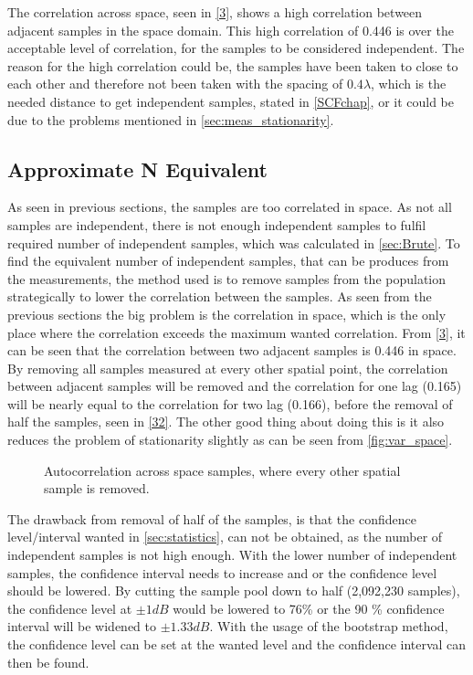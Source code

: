 The correlation across space, seen in \autoref{3}, shows a high correlation between adjacent samples in the space domain. This high correlation of 0.446 is over the acceptable level of correlation, for the samples to be considered independent. The reason for the high correlation could be, the samples have been taken to close to each other and therefore not been taken with the spacing of $0.4 \lambda$, which is the needed distance to get independent samples, stated in \autoref{SCFchap}, or it could be due to the problems mentioned in \autoref{sec:meas_stationarity}.


\subsection{Approximate N Equivalent}


As seen in previous sections, the samples are too correlated in space. As not all samples are independent, there is not enough independent samples to fulfil required number of independent samples, which was calculated in \autoref{sec:Brute}. To find the equivalent number of independent samples, that can be produces from the measurements, the method used is to remove samples from the population strategically to lower the correlation between the samples. As seen from the previous sections the big problem is the correlation in space, which is the only place where the correlation exceeds the maximum wanted correlation. From \autoref{3}, it can be seen that the correlation between two adjacent samples is 0.446 in space. By removing all samples measured at every other spatial point, the correlation between adjacent samples will be removed and the correlation for one lag (0.165) will be nearly equal to the correlation for two lag (0.166), before the removal of half the samples, seen in \autoref{32}. The other good thing about doing this is it also reduces the problem of stationarity slightly as can be seen from \autoref{fig:var_space}.


\begin{figure}[H]
\begin{center}

\caption{Autocorrelation across space samples, where every other spatial sample is removed.}
\label{32}
\end{center}
\end{figure}

The drawback from removal of half of the samples, is that the confidence level/interval wanted in \autoref{sec:statistics}, can not be obtained, as the number of independent samples is not high enough. With the lower number of independent samples, the confidence interval needs to increase and or the confidence level should be lowered. By cutting the sample pool down to half (2,092,230 samples), the confidence level at $\pm 1dB$ would be lowered to 76\% or the 90 \% confidence interval will be widened to $\pm 1.33dB$. With the usage of the bootstrap method, the confidence level can be set at the wanted level and the confidence interval can then be found.




